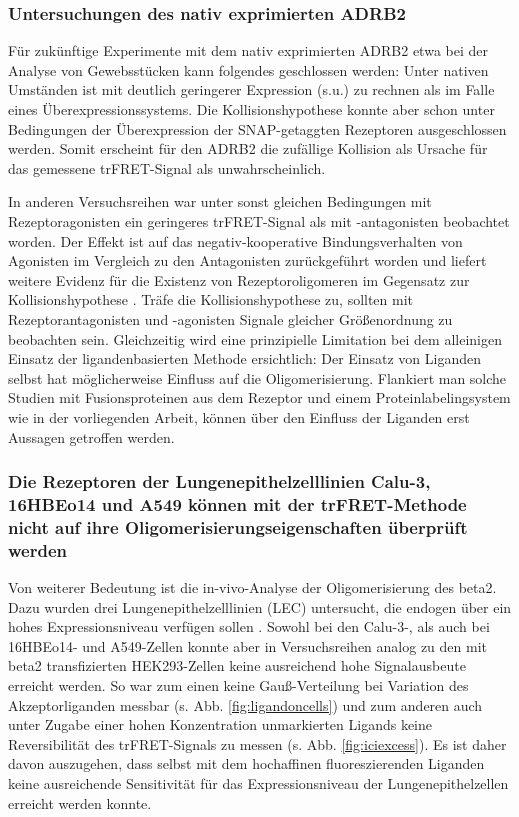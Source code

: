 \subsubsection{Untersuchungen des nativ exprimierten ADRB2}

Für zukünftige Experimente mit dem nativ exprimierten ADRB2 etwa bei der Analyse von Gewebsstücken kann folgendes geschlossen werden: Unter nativen Umständen ist mit deutlich geringerer Expression (s.u.) zu rechnen als im Falle eines Überexpressionssystems. Die Kollisionshypothese konnte aber schon unter Bedingungen der Überexpression der SNAP-getaggten Rezeptoren ausgeschlossen werden. Somit erscheint für den ADRB2 die zufällige Kollision als Ursache für das gemessene trFRET-Signal als unwahrscheinlich.

In anderen Versuchsreihen war unter sonst gleichen Bedingungen mit Rezeptoragonisten ein geringeres trFRET-Signal als mit -antagonisten beobachtet worden. Der Effekt ist auf das negativ-kooperative Bindungsverhalten von Agonisten im Vergleich zu den Antagonisten zurückgeführt worden und liefert weitere Evidenz für die Existenz von Rezeptoroligomeren im Gegensatz zur Kollisionshypothese \parencite{Cottet2012a}. Träfe die Kollisionshypothese zu, sollten mit Rezeptorantagonisten und -agonisten Signale gleicher Größenordnung zu beobachten sein. Gleichzeitig wird eine prinzipielle Limitation bei dem alleinigen Einsatz der ligandenbasierten Methode ersichtlich: Der Einsatz von Liganden selbst hat möglicherweise Einfluss auf die Oligomerisierung. Flankiert man solche Studien mit Fusionsproteinen aus dem Rezeptor und einem Proteinlabelingsystem wie in der vorliegenden Arbeit, können über den Einfluss der Liganden erst Aussagen getroffen werden.

\subsubsection{Die Rezeptoren der Lungenepithelzelllinien Calu-3, 16HBEo14 und A549 können mit der trFRET-Methode nicht auf ihre Oligomerisierungseigenschaften überprüft werden}
Von weiterer Bedeutung ist die in-vivo-Analyse der Oligomerisierung des \gls{beta2}. Dazu wurden drei Lungenepithelzelllinien (LEC) untersucht, die endogen über ein hohes Expressionsniveau verfügen sollen \parencite{Abraham2004}. Sowohl bei den Calu-3-, als auch bei 16HBEo14- und A549-Zellen konnte aber in Versuchsreihen analog zu den mit \gls{beta2} transfizierten HEK293-Zellen keine ausreichend hohe Signalausbeute erreicht werden. So war zum einen keine Gauß-Verteilung  bei Variation des Akzeptorliganden messbar (s. Abb. \ref{fig:ligandoncells}) und zum anderen auch unter Zugabe einer hohen Konzentration unmarkierten Ligands keine Reversibilität des trFRET-Signals zu messen (s. Abb. \ref{fig:iciexcess}). Es ist daher davon auszugehen, dass selbst mit dem hochaffinen fluoreszierenden Liganden keine ausreichende Sensitivität für das Expressionsniveau der Lungenepithelzellen erreicht werden konnte. 

